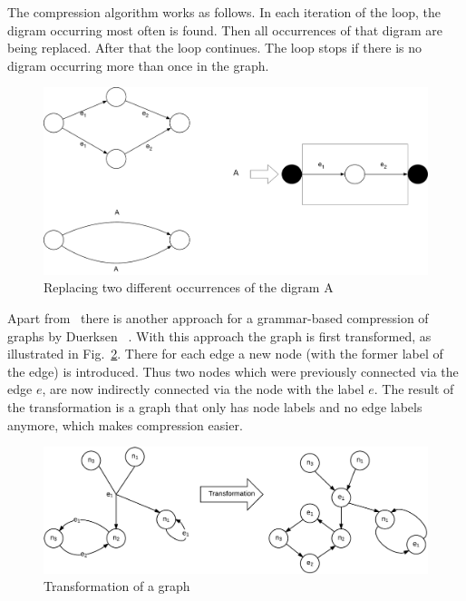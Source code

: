 \documentclass[a4paper]{scrartcl}
\begin{document}
The compression algorithm works as follows. In each iteration of the loop, the digram occurring most often is found. Then all occurrences of that digram are being replaced. After that the loop continues. The loop stops if there is no digram occurring more than once in the graph.

\begin{figure}[h]
	\centering
	\includegraphics[width=1\textwidth]{img/maneth1}
	\caption{Replacing two different occurrences of the digram A~\cite{maneth}}
	\label{fig:maneth1}
\end{figure}

Apart from~\cite{maneth} there is another approach for a grammar-based compression of graphs by Duerksen~\cite{mattdk} . With this approach the graph is first transformed, as illustrated in Fig.~\ref{fig:transf}. There for each edge a new node (with the former label of the edge) is introduced. Thus two nodes which were previously connected via the edge $e$, are now indirectly connected via the node with the label $e$. The result of the transformation is a graph that only has node labels and no edge labels anymore, which makes compression easier.

\begin{figure}[h]
	\centering
	\includegraphics[width=1\textwidth]{img/transf}
	\caption{Transformation of a graph~\cite{mattdk}}
	\label{fig:transf}
\end{figure}
\end{document}
